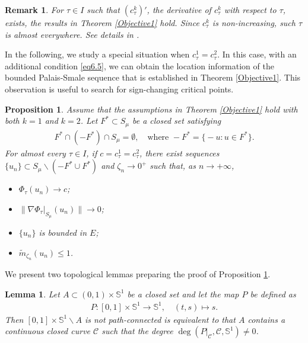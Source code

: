 \documentclass[10pt,a4paper]{article}
\newtheorem{lemma}[theorem]{Lemma}
\newtheorem{proposition}[theorem]{Proposition}
\newtheorem{remark}[theorem]{Remark}
\theoremstyle{definition} \theoremstyle{remark}
\numberwithin{equation}{section}
\newcommand{\s}{\mathbb{S}}
\begin{document}
\begin{remark} \label{rmkalmost}
	For $\tau \in I$ such that $(c_\tau^k)'$, the derivative of $c_\tau^k$ with respect to $\tau$, exists, the results in Theorem \ref{Objective1} hold. Since $c_\tau^k$ is non-increasing, such $\tau$ is almost everywhere. See details in \cite{BCJN}.
\end{remark}

In the following, we study a special situation when $c_\tau^1 = c_\tau^2$. In this case, with an additional condition \eqref{eq6.5}, we can obtain the location information of the bounded Palais-Smale sequence that is established in Theorem \ref{Objective1}. This observation is useful to search for sign-changing critical points.

\begin{proposition} \label{propc1=c2}
	Assume that the assumptions in Theorem \ref{Objective1} hold with both $k =1$ and $k =2$. Let $F^* \subset S_\mu$ be a closed set satisfying
	\begin{align} \label{eq6.5}
		F^* \cap (-F^*) \cap S_\mu = \emptyset, \quad \text{where } -F^* = \bigl\{-u: u \in F^*\bigr\}.
	\end{align}
	For almost every $\tau \in I$, if $c = c_\tau^1 = c_\tau^2$, there exist sequences
	$\{u_n\} \subset S_\mu \backslash (-F^* \cup F^*)$ and $\zeta_n \to 0^+$ such that, as
	$n \to + \infty$,
	\begin{itemize}
		\item[(i)] $\Phi_\tau(u_n) \to c$;
		\item[(ii)] $\bigl\| \nabla \Phi_\tau|_{S_\mu}(u_n)\| \to 0$;
		\item[(iii)] $\{u_n\}$ is bounded in $E$;
		\item[(iv)] $\tilde m_{\zeta_n}(u_n) \leq 1$.
	\end{itemize}
\end{proposition}

We present two topological lemmas preparing the proof of Proposition \ref{propc1=c2}.

\begin{lemma} \label{lemtopo1}
	Let $A \subset (0,1) \times \s^1$ be a closed set and let the map $P$ be defined as
	\begin{align*}
		P: [0,1] \times \s^1 \to \s^1, \quad (t,s) \mapsto s.
	\end{align*}
	Then $[0,1] \times \s^1 \backslash A$ is not path-connected is equivalent to that $A$ contains a continuous closed curve $\mathcal{C}$ such that the degree $\deg(P|_{\mathcal{C}},\mathcal{C},\s^1) \neq 0$.
\end{lemma}
\end{document}
